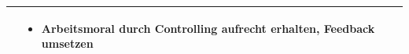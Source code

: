\begin{center}
\begin{scriptsize}
\begin{tabularx}{\textwidth}{|p{8cm}|X|}
\begin{minipage}{.56\textwidth}
\begin{flushleft}
\begin{itemize}
    \end{itemize}
    \end{flushleft}
    \end{minipage} &
    \begin{minipage}{.4\textwidth} 
    \begin{flushleft}
        \begin{itemize} \vspace{-0.4cm}  
         \item Arbeitsmoral durch Controlling aufrecht erhalten, Feedback umsetzen
         \vspace{0.2cm}
    \end{itemize}
    \end{flushleft}
    \end{minipage} \\
    \hline
\end{tabularx}
\end{scriptsize}
\end{center}
\endgroup

\newpage

